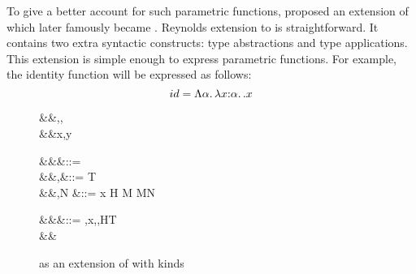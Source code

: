 \documentclass[manuscript,screen,nonacm]{acmart}
\begin{document}
To give a better account for such parametric functions, \citet{reynolds_towards_1974} proposed an extension of \STLC which later famously became \SF. Reynolds extension to \STLC is straightforward. It contains two extra syntactic constructs: type abstractions and type applications. This extension is simple enough to express parametric functions. For example, the identity function will be expressed as follows:
$$
id = \Lambda \alpha.\, \lambda x{:}\alpha.\, . x
$$
\begin{figure}[ht]
  \centering
  \begin{syntax}
     &&\alpha,\beta,\gamma \\
     &&x,y          \\
  \end{syntax}
  \begin{syntax}
         &&\kappa       &::= \star \mid \kappa \to \kappa\\
         &&\tau,\sigma  &::= \alpha \mid T \mid \tau \to \tau \mid \tau\App\tau \mid \syntaxhl{\Forall {\alpha\co\kappa} \tau}\\
         &&\Tm,N          &::= x \mid  H \mid {} M \mid M\App N \mid {}\\
  \end{syntax}
  \begin{syntax}
     &&\TEnv &::= \empt \mid \TEnv,x\co\tau \mid \TEnv,\alpha\co\kappa \mid \TEnv,H\co T\\
      &&\Subst
  \end{syntax}
  \caption{\SF as an extension of \STLC with kinds}
  \label{fig:system-f-syntax}
\end{figure}

\newcommand\KVar{
  \ib{\irule[\trule{k-var}]
    {\alpha\co\kappa \in \TEnv};
    {\Kinding \TEnv \alpha \kappa}}
}

\newcommand\KVarCo{
  \ib{\irule[\trule{co-var}]
    {c \co \sigma\sim\tau \in \TEnv};
    {\Kinding \TEnv c \sigma\sim\tau}}
}


\newcommand\KConst{
  \ib{\irule[\trule{k-const}]
    {T\co\kappa \in \TEnv};
    {\Kinding \TEnv T \kappa}}
}

\newcommand\KTApp{
  \ib{\irule[\trule{k-tapp}]
    {\Kinding \TEnv {\tau_1} {\kappa_1 \to \kappa}}
    {\Kinding \TEnv {\tau_2} {\kappa_1}};
    {\Kinding \TEnv {\tau_1\App \tau_2} \kappa}}
}


\newcommand\TVar{
  \ib{\irule[\trule{var}]
    {x\co\tau \in \TEnv}
    {\Kinding \TEnv \tau \kappa};
    {\Typing \TEnv x \tau}}
}
\end{document}
